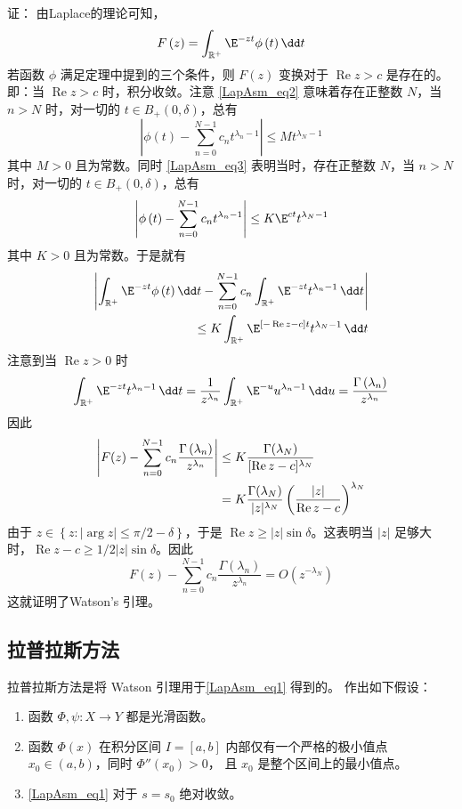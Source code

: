 证：
由Laplace的理论可知， 
\[
F\left(z\right)=\int_{\mathbb{R}^+}{\E^{-zt}\phi\left(t\right)}\,\dd t
\]
若函数 $\phi$ 满足定理中提到的三个条件，则 $F(z)$ 变换对于 $\operatorname{Re} z>c$ 是存在的。即：当 $\operatorname{Re} z>c$ 时，积分收敛。注意 \autoref{LapAsm_eq2} 意味着存在正整数 $N$，当 $n>N$ 时，对一切的 $t\in B_{+}(0,\delta)$，总有
\[
  \left|\phi\left(t\right)-\sum_{n=0}^{N-1}{c_nt^{\lambda_n-1}}\right|\le Mt^{\lambda_N-1}
\]
其中 $M>0$ 且为常数。同时 \autoref{LapAsm_eq3} 表明当时，存在正整数 $N$，当 $n>N$ 时，对一切的 $t\in B_{+}(0,\delta)$，总有
\[
  \left|\phi\left(t\right)-\sum_{n=0}^{N-1}{c_nt^{\lambda_n-1}}\right|\le K\E^{ct}t^{\lambda_N-1}
\]
其中 $K>0$ 且为常数。于是就有
\begin{align*}
  \left|\int_{\mathbb{R}^+}{\E^{-zt}\phi\left(t\right)}\,\dd t-\sum_{n=0}^{N-1}{c_n\int_   {\mathbb{R}^+}{\E^{-zt}t^{\lambda_n-1}}\,\dd t}\right|\\
  \le K\int_{\mathbb{R}^+}\E^{[-\operatorname{Re}z-c]t}t^{\lambda_N-1}\,\dd t
\end{align*}
注意到当 $\operatorname{Re}z>0$ 时
\[
  \int_{\mathbb{R}^+}{\E^{-zt}t^{\lambda_n-1}}\,\dd t
  =\frac{1}{z^{\lambda_n}}\int_{\mathbb{R}^+}{\E^{-u}u^{\lambda_n-1}}\,\dd u
  =\frac{\Gamma\left(\lambda_n\right)}{z^{\lambda_n}}
\]
因此
\begin{align*}
  \left|F(z)-\sum_{n=0}^{N-1}{c_n\frac{\Gamma\left(\lambda_n\right)}{z^{\lambda_n}}}\right|
  &\le K {\Gamma(\lambda_{N})\over \operatorname{[Re}z-c]^{\lambda_N}}\nonumber\\
  &=K{\Gamma(\lambda_{N})\over |z|^{\lambda_N}}\left(|z|\over \operatorname{Re}z-c\right)^{\lambda_N}\nonumber
\end{align*}
由于 $z\in{\left\{z:\left|\arg{z}\right|\le\pi/2-\delta\right\}}$，于是 $\operatorname{Re}z\geq |z|\sin \delta$。这表明当 $\left|z\right|$ 足够大时，$\operatorname{Re}z-c\geqslant1/2|z|\sin \delta$。因此
\[
F\left(z\right)-\sum_{n=0}^{N-1}{c_n\frac{\Gamma\left(\lambda_n\right)}{z^{\lambda_n}}}=O\left(z^{-\lambda_N}\right)
\]
这就证明了Watson's 引理。

\subsection{拉普拉斯方法}
拉普拉斯方法是将 Watson 引理用于\autoref{LapAsm_eq1} 得到的。 作出如下假设：

\begin{enumerate}
  \item 函数 $\Phi,\psi:X\to Y$ 都是光滑函数。
  \item 函数 $\Phi(x)$ 在积分区间 $I=[a,b]$ 内部仅有一个严格的极小值点 $x_0\in(a,b)$，同时 $\Phi''(x_0)>0$， 且 $x_0$ 是整个区间上的最小值点。

  \item \autoref{LapAsm_eq1} 对于 $s=s_0$ 绝对收敛。
\end{enumerate}

